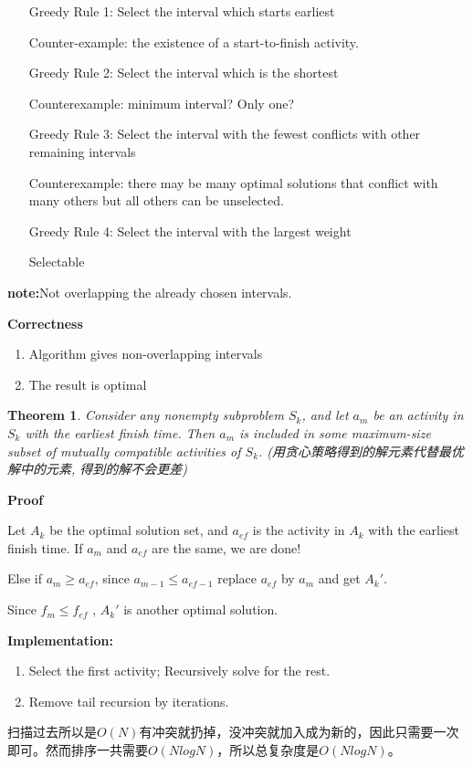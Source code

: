 \documentclass{article}
\newtheorem*{Theorem}{Theorem}
\begin{document}
\begin{enumerate}
    \item [Greedy Rule 1:] Select the interval which starts earliest \par
    Counter-example: the existence of a start-to-finish activity.
    \item [Greedy Rule 2:] Select the interval which is the shortest \par
    Counterexample: minimum interval? Only one?
    \item [Greedy Rule 3:] Select the interval with the fewest conflicts with other remaining intervals \par
    Counterexample: there may be many optimal solutions that conflict with many others but all others can be unselected.
    \item [Greedy Rule 4:] Select the interval with the largest weight\par
    Selectable
\end{enumerate}
\textbf{note:}Not overlapping the already chosen intervals.\par
\hspace*{\fill}\par
\textbf{Correctness}
\begin{enumerate}
    \item Algorithm gives non-overlapping intervals
    \item The result is optimal
\end{enumerate}
\begin{Theorem}
    Consider any nonempty subproblem $S_k$, and let $a_m$ be an activity in $S_k$ with the earliest finish time.  Then $a_m$ is included in some maximum-size subset of mutually compatible activities of $S_k$. (用贪心策略得到的解元素代替最优解中的元素, 得到的解不会更差)
\end{Theorem}
\textbf{Proof}\par
Let $A_k$ be the optimal solution set, and $a_{ef}$ is the activity in $A_k$ with the earliest finish time.
If $a_m$ and $a_{ef}$ are the same, we are done! \par
Else if $a_m \ge a_{ef}$, since $a_{m-1} \le a_{ef-1}$ replace $a_{ef}$ by $a_m$ and get $A_k'$.\par
Since $f_m \le f_{ef}$ , $A_k'$ is another optimal solution.\par

\hspace*{\fill}\par

\textbf{Implementation:}
\begin{enumerate}
    \item Select the first activity; Recursively solve for the rest.
    \item Remove tail recursion by iterations.
\end{enumerate}\par
扫描过去所以是$O(N)$有冲突就扔掉，没冲突就加入成为新的，因此只需要一次即可。然而排序一共需要$O(NlogN)$，所以总复杂度是$O(NlogN)$。\par
\end{document}
